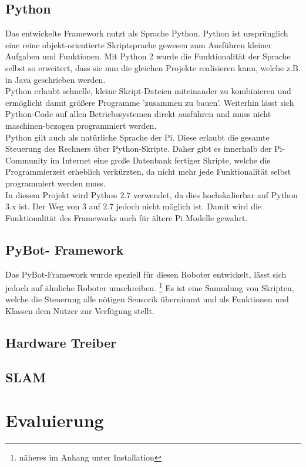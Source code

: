 \documentclass[a4paper,cleardoubleempty,BCOR1cm]{book}
\begin{document}
\subsection{Python}
Das entwickelte Framework nutzt als Sprache Python. Python ist ursprünglich eine reine objekt-orientierte Skriptsprache gewesen zum Ausführen kleiner Aufgaben und Funktionen. Mit Python 2 wurde die Funktionalität der Sprache selbst so erweitert, dass sie nun die gleichen Projekte realisieren kann, welche z.B. in Java geschrieben werden. \\
Python erlaubt schnelle, kleine Skript-Dateien miteinander zu kombinieren und ermöglicht damit größere Programme 'zusammen zu bauen'. Weiterhin lässt sich Python-Code auf allen Betriebssystemen direkt ausführen und muss nicht maschinen-bezogen programmiert werden. \\
Python gilt auch als natürliche Sprache der Pi. Diese erlaubt die gesamte Steuerung des Rechners über Python-Skripte. Daher gibt es innerhalb der Pi-Community im Internet eine große Datenbank fertiger Skripte, welche die Programmierzeit erheblich verkürzten, da nicht mehr jede Funktionalität selbst programmiert werden muss. \\
In diesem Projekt wird Python 2.7 verwendet, da dies hochskalierbar auf Python 3.x ist. Der Weg von 3 auf 2.7 jedoch nicht möglich ist. Damit wird die Funktionalität des Frameworks auch für ältere Pi Modelle gewahrt.

 
\subsection{PyBot- Framework}
Das PyBot-Framework wurde speziell für diesen Roboter entwickelt, lässt sich jedoch auf ähnliche Roboter umschreiben. \footnote{näheres im Anhang unter Installation}
Es ist eine Sammlung von Skripten, welche die Steuerung alle nötigen Sensorik übernimmt und als Funktionen und Klassen dem Nutzer zur Verfügung stellt. 


\subsection{Hardware Treiber}

\subsection{SLAM}



\section{Evaluierung}
\end{document}
